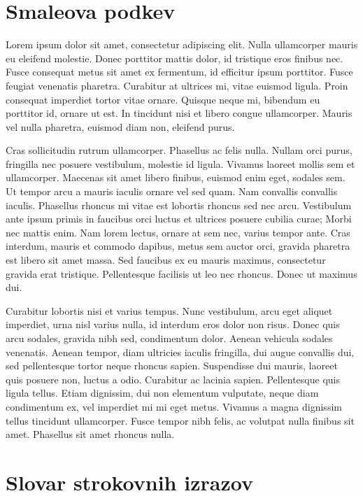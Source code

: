 \documentclass{isrmdelo}
\begin{document}
\chapter{Smaleova podkev}

Lorem ipsum dolor sit amet, consectetur adipiscing elit. Nulla ullamcorper mauris eu eleifend molestie. Donec porttitor mattis dolor, id tristique eros finibus nec. Fusce consequat metus sit amet ex fermentum, id efficitur ipsum porttitor. Fusce feugiat venenatis pharetra. Curabitur at ultrices mi, vitae euismod ligula. Proin consequat imperdiet tortor vitae ornare. Quisque neque mi, bibendum eu porttitor id, ornare ut est. In tincidunt nisi et libero congue ullamcorper. Mauris vel nulla pharetra, euismod diam non, eleifend purus.

Cras sollicitudin rutrum ullamcorper. Phasellus ac felis nulla. Nullam orci purus, fringilla nec posuere vestibulum, molestie id ligula. Vivamus laoreet mollis sem et ullamcorper. Maecenas sit amet libero finibus, euismod enim eget, sodales sem. Ut tempor arcu a mauris iaculis ornare vel sed quam. Nam convallis convallis iaculis. Phasellus rhoncus mi vitae est lobortis rhoncus sed nec arcu. Vestibulum ante ipsum primis in faucibus orci luctus et ultrices posuere cubilia curae; Morbi nec mattis enim. Nam lorem lectus, ornare at sem nec, varius tempor ante. Cras interdum, mauris et commodo dapibus, metus sem auctor orci, gravida pharetra est libero sit amet massa. Sed faucibus ex eu mauris maximus, consectetur gravida erat tristique. Pellentesque facilisis ut leo nec rhoncus. Donec ut maximus dui.

Curabitur lobortis nisi et varius tempus. Nunc vestibulum, arcu eget aliquet imperdiet, urna nisl varius nulla, id interdum eros dolor non risus. Donec quis arcu sodales, gravida nibh sed, condimentum dolor. Aenean vehicula sodales venenatis. Aenean tempor, diam ultricies iaculis fringilla, dui augue convallis dui, sed pellentesque tortor neque rhoncus sapien. Suspendisse dui mauris, laoreet quis posuere non, luctus a odio. Curabitur ac lacinia sapien. Pellentesque quis ligula tellus. Etiam dignissim, dui non elementum vulputate, neque diam condimentum ex, vel imperdiet mi mi eget metus. Vivamus a magna dignissim tellus tincidunt ullamcorper. Fusce tempor nibh felis, ac volutpat nulla finibus sit amet. Phasellus sit amet rhoncus nulla. 

\chapter*{Slovar strokovnih izrazov}


\nocite{*}



\end{document}

